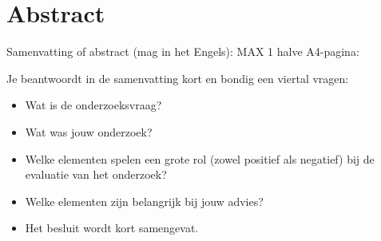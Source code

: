 \chapter{Abstract}

Samenvatting of abstract (mag in het Engels): MAX 1 halve A4-pagina:  

Je beantwoordt in de samenvatting kort en bondig een viertal vragen:  
\begin{itemize}
  \item Wat is de onderzoeksvraag? 
  \item Wat was jouw onderzoek?  
  \item Welke elementen spelen een grote rol (zowel positief als negatief) bij de evaluatie van het onderzoek?  
  \item Welke elementen zijn belangrijk bij jouw advies? 
  \item Het besluit wordt kort samengevat.
\end{itemize}
